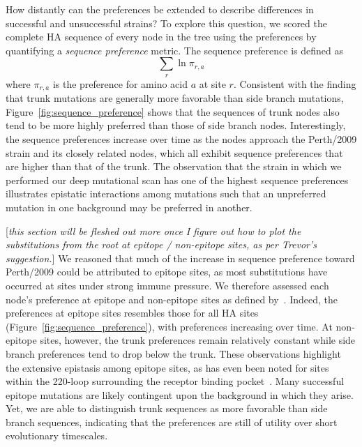 \documentclass[11pt]{article}
\newcommand{\comment}[1]{{\color{red}[\textsl{#1}]}}
\begin{document}
How distantly can the preferences be extended to describe differences in successful and unsuccessful strains?
To explore this question, we scored the complete HA sequence of every node in the tree using the preferences by quantifying a \textit{sequence preference} metric.
The sequence preference is defined as 
$$\displaystyle\sum_{r} \ln \pi_{r, a}$$
where $\pi_{r, a}$ is the preference for amino acid $a$ at site $r$.
Consistent with the finding that trunk mutations are generally more favorable than side branch mutations, Figure~\ref{fig:sequence_preference} shows that the sequences of trunk nodes also tend to be more highly preferred than those of side branch nodes.
Interestingly, the sequence preferences increase over time as the nodes approach the Perth/2009 strain and its closely related nodes, which all exhibit sequence preferences that are higher than that of the trunk. 
The observation that the strain in which we performed our deep mutational scan has one of the highest sequence preferences illustrates epistatic interactions among mutations such that an unpreferred mutation in one background may be preferred in another.

\comment{this section will be fleshed out more once I figure out how to plot the substitutions from the root at epitope / non-epitope sites, as per Trevor's suggestion.}
We reasoned that much of the increase in sequence preference toward Perth/2009 could be attributed to epitope sites, as most substitutions have occurred at sites under strong immune pressure.
We therefore assessed each node's preference at epitope and non-epitope sites as defined by~\cite{wolf2006long}.
Indeed, the preferences at epitope sites resembles those for all HA sites (Figure~\ref{fig:sequence_preference}), with preferences increasing over time.
At non-epitope sites, however, the trunk preferences remain relatively constant while side branch preferences tend to drop below the trunk.
These observations highlight the extensive epistasis among epitope sites, as has even been noted for sites within the 220-loop surrounding the receptor binding pocket~\citep{wu2017diversity}.
Many successful epitope mutations are likely contingent upon the background in which they arise.
Yet, we are able to distinguish trunk sequences as more favorable than side branch sequences, indicating that the preferences are still of utility over short evolutionary timescales. 
\end{document}
